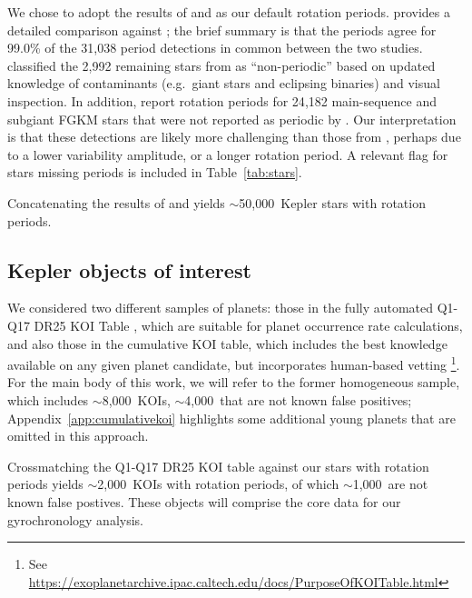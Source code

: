 \documentclass[11pt,twocolumn,tighten]{aastex63}
\newcommand{\nstarswithprot}{{$\sim$50{,}000}}
\newcommand{\nkois}{{$\sim$8{,}000}} %
\newcommand{\nkoisnofp}{{$\sim$4{,}000}} %
\newcommand{\nkoiswithprot}{{$\sim$2{,}000}}
\newcommand{\nkoisnofpwithprot}{{$\sim$1{,}000}}
\begin{document}
We chose to adopt the results of  and
 as our default rotation periods.
 provides a detailed comparison against
; the brief summary is that the periods
agree for 99.0\% of the 31{,}038 period detections in common between
the two studies.   classified the 2{,}992
remaining stars from  as ``non-periodic''
based on updated knowledge of contaminants (e.g.~giant stars and
eclipsing binaries) and visual inspection.  In addition,
 report rotation periods for 24{,}182
main-sequence and subgiant FGKM stars that were not reported as
periodic by .  Our interpretation is that
these detections are likely more challenging than those from
, perhaps due to a lower variability
amplitude, or a longer rotation period.  A relevant flag for stars
missing  periods is included in
Table~\ref{tab:stars}.

Concatenating the results of  and
 yields \nstarswithprot\ Kepler stars with
rotation periods.

\subsection{Kepler objects of interest}
\label{subsec:planetsel}

We considered two different samples of planets: those in the fully
automated Q1-Q17 DR25 KOI Table \citep{Thompson_2018}, which are
suitable for planet occurrence rate calculations, and also those in
the cumulative KOI table, which includes the best knowledge available
on any given planet candidate, but incorporates human-based vetting
\footnote{See
\url{https://exoplanetarchive.ipac.caltech.edu/docs/PurposeOfKOITable.html}}.
For the main body of this work, we will refer to the former
homogeneous sample, which includes \nkois\ KOIs, \nkoisnofp\ that are
not known false positives;
Appendix~\ref{app:cumulativekoi} highlights some additional young
planets that are omitted in this approach.

Crossmatching the Q1-Q17 DR25 KOI table against our stars with
rotation periods yields \nkoiswithprot\ KOIs with rotation periods, of which \nkoisnofpwithprot\ 
are not known false postives.
These objects will comprise the core data for our gyrochronology analysis.
\end{document}
